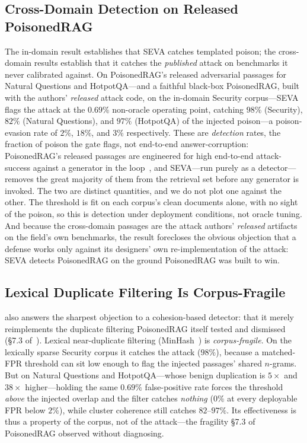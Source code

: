 \documentclass[10pt,journal,compsoc]{IEEEtran}
\begin{document}
\subsection{Cross-Domain Detection on Released PoisonedRAG}
The in-domain result establishes that SEVA catches templated poison; the
cross-domain results establish that it catches the \emph{published} attack on
benchmarks it never calibrated against. On PoisonedRAG's released adversarial
passages for Natural Questions and HotpotQA---and a faithful black-box PoisonedRAG,
built with the authors' \emph{released} attack code, on the in-domain Security
corpus---SEVA flags
the attack at the $0.69\%$ non-oracle operating point, catching $98\%$ (Security),
$82\%$ (Natural Questions), and $97\%$ (HotpotQA) of the injected poison---a poison-evasion rate of $2\%$, $18\%$, and $3\%$
respectively. These are \emph{detection} rates, the fraction of poison the gate
flags, not end-to-end answer-corruption: PoisonedRAG's released passages are
engineered for high end-to-end attack-success against a generator in the
loop~\cite{poisonedrag}, and SEVA---run purely as a detector---removes the great
majority of them from the retrieval set before any generator is invoked. The two are
distinct quantities, and we do not plot one against the other.
The threshold is fit on each corpus's clean documents alone, with no sight of the
poison, so this is detection under deployment conditions, not oracle tuning. And
because the cross-domain passages are the attack authors' \emph{released} artifacts
on the field's own benchmarks, the result forecloses the obvious objection that a
defense works only
against its designers' own re-implementation of the attack: SEVA detects
PoisonedRAG on the ground PoisonedRAG was built to win.

\subsection{Lexical Duplicate Filtering Is Corpus-Fragile}
\label{subsec:lex} also answers the sharpest objection to a cohesion-based detector: that
it merely reimplements the duplicate filtering PoisonedRAG itself tested and dismissed
(\S7.3 of~\cite{poisonedrag}). Lexical near-duplicate filtering (MinHash~\cite{minhash}) is \emph{corpus-fragile}. On the lexically
sparse Security corpus it catches the attack ($98\%$), because a matched-FPR threshold can sit
low enough to flag the injected passages' shared $n$-grams. But on Natural Questions and
HotpotQA---whose benign duplication is $5\times$ and $38\times$ higher---holding the same
$0.69\%$ false-positive rate forces the threshold \emph{above} the injected overlap and the
filter catches \emph{nothing} ($0\%$ at every deployable FPR below $2\%$), while cluster
coherence still catches $82$--$97\%$. Its effectiveness is thus a property of the corpus, not of
the attack---the fragility \S7.3 of PoisonedRAG observed without diagnosing.
\end{document}
